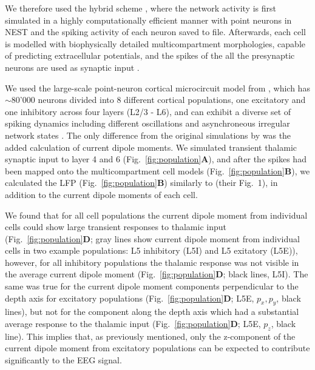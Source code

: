 \documentclass[preprint,10pt,authoryear]{elsarticle}
\begin{document}
We therefore used the hybrid scheme \citep{HAGEN2016, SENK2018}, where the network activity is first simulated in a highly computationally efficient manner with point neurons in NEST \citep{NEST} and the spiking activity of each neuron saved to file. Afterwards, each cell is modelled with biophysically detailed multicompartment morphologies, capable of predicting extracellular potentials, and the spikes of the all the presynaptic neurons are used as synaptic input \citep{HAGEN2016, SENK2018}.

We used the large-scale point-neuron cortical microcircuit model from \cite{POTJANS2014, HAGEN2016}, which has $\sim$80'000 neurons divided into 8 different cortical populations, one excitatory and one inhibitory across four layers (L2/3 - L6), and can exhibit a diverse set of spiking dynamics including different oscillations and asynchroneous irregular network states \citep{HAGEN2016, BRUNEL2000}. 
The only difference from the original simulations by \cite{HAGEN2016} was the added calculation of current dipole moments.
We simulated transient thalamic synaptic input to layer 4 and 6 (Fig.~\ref{fig:population}\textbf{A}), and after the spikes had been mapped onto the multicompartment cell models (Fig.~\ref{fig:population}\textbf{B}), we calculated the LFP (Fig.~\ref{fig:population}\textbf{B}) similarly to \cite{HAGEN2016} (their Fig.~1), in addition to the current dipole moments of each cell.


We found that for all cell populations the current dipole moment from individual cells could show large transient responses to thalamic input (Fig.~\ref{fig:population}\textbf{D}; gray lines show current dipole moment from individual cells in two example populations: L5 inhibitory (L5I) and L5 exitatory (L5E)), however, for all inhibitory populations the thalamic response was not visible in the average current dipole moment (Fig.~\ref{fig:population}\textbf{D}; black lines, L5I). The same was true for the  current dipole moment components perpendicular to the depth axis for excitatory populations (Fig.~\ref{fig:population}\textbf{D}; L5E, $p_x, p_y$, black lines), but not for the component along the depth axis which had a substantial average response to the thalamic input (Fig.~\ref{fig:population}\textbf{D}; L5E, $p_z$, black line). 
This implies that, as previously mentioned, only the z-component of the current dipole moment from excitatory populations can be expected to contribute significantly to the EEG signal.
\end{document}
